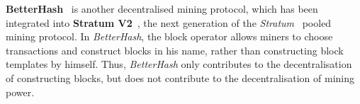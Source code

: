 \textbf{BetterHash}~\cite{draft-bip-BetterHash} is another decentralised mining protocol, which has been integrated into \textbf{Stratum V2}~\cite{stratum-v2}, the next generation of the \textit{Stratum}~\cite{stratum} pooled mining protocol.
In \textit{BetterHash}, the block operator allows miners to choose transactions and construct blocks in his name, rather than constructing block templates by himself.
Thus, \textit{BetterHash} only contributes to the decentralisation of constructing blocks, but does not contribute to the decentralisation of mining power.